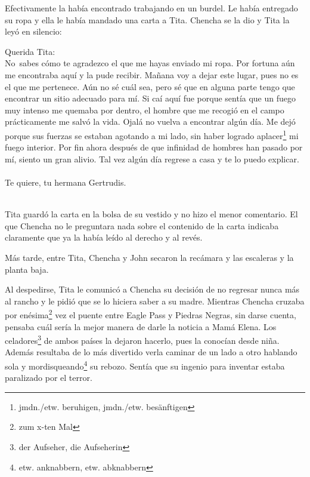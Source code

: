 Efectivamente la había encontrado trabajando en un burdel. Le había
entregado su ropa y ella le había mandado una carta a Tita. Chencha se
la dio y Tita la leyó en silencio:
\\[1em]
\begin{itshape}
Querida Tita:
\\

No~sabes cómo te agradezco el que me hayas enviado mi ropa. Por
fortuna aún me encontraba aquí y la pude recibir. Mañana voy a dejar
este lugar, pues no es el que me pertenece. Aún no sé cuál sea, pero sé
que en alguna parte tengo que encontrar un sitio adecuado para mí. Si
caí aquí fue porque sentía que un fuego muy intenso me quemaba por
dentro, el hombre que me recogió en el campo prácticamente me salvó la
vida. Ojalá no vuelva a encontrar algún día. Me dejó porque sus fuerzas
se estaban agotando a mi lado, sin haber logrado aplacer\footnote{jmdn./etw. beruhigen, jmdn./etw. besänftigen}
mi fuego interior. Por fin ahora después de que infinidad de hombres han pasado
por mí, siento un gran alivio. Tal vez algún día regrese a casa y te lo
puedo explicar.
\\~\\
Te quiere, tu hermana Gertrudis.
\end{itshape}
\\[1em]

Tita guardó la carta en la bolsa de su vestido y no hizo el menor
comentario. El que Chencha no le preguntara nada sobre el contenido de
la carta indicaba claramente que ya la había leído al derecho y al
revés.

Más tarde, entre Tita, Chencha y John secaron la recámara y las
escaleras y la planta baja.

Al despedirse, Tita le comunicó a Chencha su decisión de no regresar
nunca más al rancho y le pidió que se lo hiciera saber a su madre.
Mientras Chencha cruzaba por enésima\footnote{zum x-ten Mal}
vez el puente entre Eagle Pass y Piedras Negras, sin darse cuenta, pensaba
cuál sería la mejor manera de darle la noticia a Mamá Elena. Los celadores\footnote{der Aufseher, die Aufseherin} de
ambos países la dejaron hacerlo, pues la conocían desde niña. Además
resultaba de lo más divertido verla caminar de un lado a otro hablando
sola y mordisqueando\footnote{etw. anknabbern, etw. abknabbern}
su rebozo. Sentía que su ingenio para inventar estaba paralizado por el
terror.

